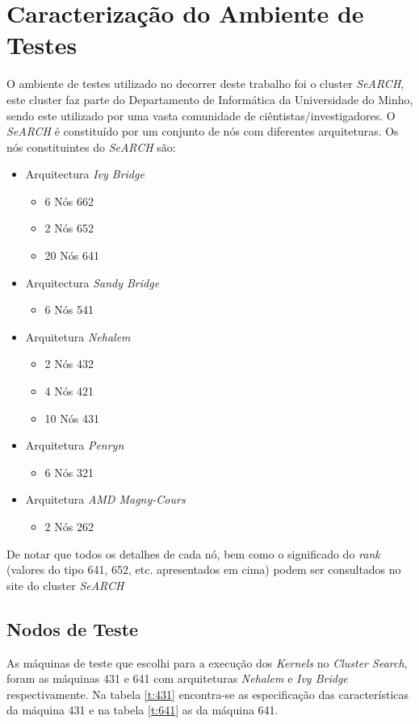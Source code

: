 \documentclass[conference,compsoc]{IEEEtran}
\begin{document}
\section{Caracterização do Ambiente de Testes}
O ambiente de testes utilizado no decorrer deste trabalho foi o cluster \textit{SeARCH}, este cluster faz parte do Departamento de Informática da Universidade do Minho, sendo este utilizado por uma vasta comunidade de ciêntistas/investigadores. O \textit{SeARCH} é constituído por um conjunto de nós com diferentes arquiteturas. Os nós constituintes do \textit{SeARCH} são:
\begin{itemize}
\item Arquitectura \textit{Ivy Bridge}
\begin{itemize}
\item 6 Nós 662
\item 2 Nós 652
\item 20 Nós 641
\end{itemize}
\item Arquitectura \textit{Sandy Bridge}
\begin{itemize}
\item 6 Nós 541
\end{itemize}
\item Arquitetura \textit{Nehalem}
\begin{itemize}
\item 2 Nós 432
\item 4 Nós 421
\item 10 Nós 431
\end{itemize}
\item Arquitetura \textit{Penryn}
\begin{itemize}
\item 6 Nós 321
\end{itemize}
\item Arquitetura \textit{AMD Magny-Cours}
\begin{itemize}
\item 2 Nós 262
\end{itemize}
\end{itemize}
De notar que todos os detalhes de cada nó, bem como o significado do \textit{rank} (valores do tipo 641, 652, etc. apresentados em cima) podem ser consultados no site do cluster \textit{SeARCH}\cite{search}

\subsection{Nodos de Teste}
As máquinas de teste que escolhi para a execução dos \textit{Kernels} no \textit{Cluster Search}, foram as máquinas 431 e 641 com arquiteturas \textit{Nehalem} e \textit{Ivy Bridge} respectivamente. Na tabela \ref{t:431} encontra-se as especificação das características da máquina 431 e na tabela \ref{t:641} as da máquina 641.
\end{document}
